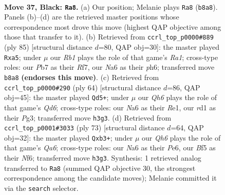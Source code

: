 \documentclass[11pt]{article}
\begin{document}
\begin{figure}[p]\centering
\begin{subfigure}{0.46\textwidth}\centering
\resizebox{\linewidth}{!}{%
\newchessgame
\chessboard[
  setfen={1r4k1/pp6/n5p1/2pPQbp1/8/P4PPq/1PB5/2RR2K1 b - - 0 37},
  showmover=false,
  pgfstyle=straightmove, color=movearrow, markmove={b8-a8}
]}
\caption{}
\end{subfigure}\hfill
\begin{subfigure}{0.46\textwidth}\centering
\resizebox{\linewidth}{!}{%
\newchessgame
\chessboard[
  setfen={r6k/5r2/5p1P/QBP1n1pP/p7/Pp3b2/1P1R4/K1R3B1 b - - 0 43},
  showmover=false,
  pgfstyle=straightmove, color=movearrow, markmove={a8-a5}
]}
\caption{}
\end{subfigure}
\\[4pt]
\begin{subfigure}{0.46\textwidth}\centering
\resizebox{\linewidth}{!}{%
\newchessgame
\chessboard[
  setfen={r4rk1/1p4p1/1B1Q3p/pqP5/4R3/P4pPb/5P2/4R1K1 w - - 4 33},
  showmover=false,
  pgfstyle=straightmove, color=movearrow, markmove={d6-d5}
]}
\caption{}
\end{subfigure}\hfill
\begin{subfigure}{0.46\textwidth}\centering
\resizebox{\linewidth}{!}{%
\newchessgame
\chessboard[
  setfen={r5k1/5pp1/4pn1p/1b6/3QPP2/qP4P1/3R2BP/1K1R4 b - - 2 37},
  showmover=false,
  pgfstyle=straightmove, color=movearrow, markmove={a3-b3}
]}
\caption{}
\end{subfigure}
\caption{\textbf{Move 37, Black: \texttt{Ra8}.} (a) Our position; Melanie plays \texttt{Ra8} (\texttt{b8a8}). Panels (b)--(d) are the retrieved master positions whose correspondence most drove this move (highest QAP objective among those that transfer to it). (b) Retrieved from \texttt{ccrl\_top\_p0000\#889} (ply 85) [structural distance $d$=80, QAP obj=30]: the master played \texttt{Rxa5}; under $\mu$ our \emph{Rb1} plays the role of that game's \emph{Ra1}; cross-type roles: our \emph{P}b7 as their \emph{R}f7, our \emph{N}a6 as their \emph{p}h6; transferred move \texttt{b8a8} \textbf{(endorses this move)}. (c) Retrieved from \texttt{ccrl\_top\_p0000\#290} (ply 64) [structural distance $d$=86, QAP obj=45]: the master played \texttt{Qd5+}; under $\mu$ our \emph{Qh6} plays the role of that game's \emph{Qd6}; cross-type roles: our \emph{N}a6 as their \emph{R}e1, our \emph{r}d1 as their \emph{P}g3; transferred move \texttt{h3g3}. (d) Retrieved from \texttt{ccrl\_top\_p0001\#3033} (ply 73) [structural distance $d$=64, QAP obj=32]: the master played \texttt{Qxb3+}; under $\mu$ our \emph{Qh6} plays the role of that game's \emph{Qa6}; cross-type roles: our \emph{N}a6 as their \emph{P}e6, our \emph{B}f5 as their \emph{N}f6; transferred move \texttt{h3g3}. Synthesis: 1 retrieved analog transferred to \texttt{Ra8} (summed QAP objective 30, the strongest correspondence among the candidate moves); Melanie committed it via the \texttt{search} selector.}
\label{fig:thought-m73}
\end{figure}
\end{document}
